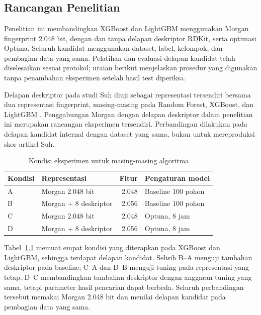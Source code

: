 \chapter{\babTiga}

\section{Rancangan Penelitian}
Penelitian ini membandingkan XGBoost dan LightGBM menggunakan Morgan fingerprint 2.048 bit, dengan dan tanpa delapan deskriptor RDKit, serta optimasi Optuna. Seluruh kandidat menggunakan dataset, label, kelompok, dan pembagian data yang sama. Pelatihan dan evaluasi delapan kandidat telah diselesaikan sesuai protokol; uraian berikut menjelaskan prosedur yang digunakan tanpa penambahan eksperimen setelah hasil test diperiksa.

Delapan deskriptor pada studi Suh diuji sebagai representasi tersendiri bersama dua representasi fingerprint, masing-masing pada Random Forest, XGBoost, dan LightGBM \cite{suh2025}. Penggabungan Morgan dengan delapan deskriptor dalam penelitian ini merupakan rancangan eksperimen tersendiri. Perbandingan dilakukan pada delapan kandidat internal dengan dataset yang sama, bukan untuk mereproduksi skor artikel Suh.

\begin{table}[htbp]
\centering
\caption{Kondisi eksperimen untuk masing-masing algoritma}
\label{tab:kondisi_perfume_five}
\small
\begin{tabular}{llrl}
\toprule
Kondisi & Representasi & Fitur & Pengaturan model \\
\midrule
A & Morgan 2.048 bit & 2.048 & Baseline 100 pohon \\
B & Morgan + 8 deskriptor & 2.056 & Baseline 100 pohon \\
C & Morgan 2.048 bit & 2.048 & Optuna, 8 jam \\
D & Morgan + 8 deskriptor & 2.056 & Optuna, 8 jam \\
\bottomrule
\end{tabular}
\end{table}

Tabel~\ref{tab:kondisi_perfume_five} memuat empat kondisi yang diterapkan pada XGBoost dan LightGBM, sehingga terdapat delapan kandidat. Selisih B--A menguji tambahan deskriptor pada baseline; C--A dan D--B menguji tuning pada representasi yang tetap. D--C membandingkan tambahan deskriptor dengan anggaran tuning yang sama, tetapi parameter hasil pencarian dapat berbeda. Seluruh perbandingan tersebut memakai Morgan 2.048 bit dan menilai delapan kandidat pada pembagian data yang sama.

